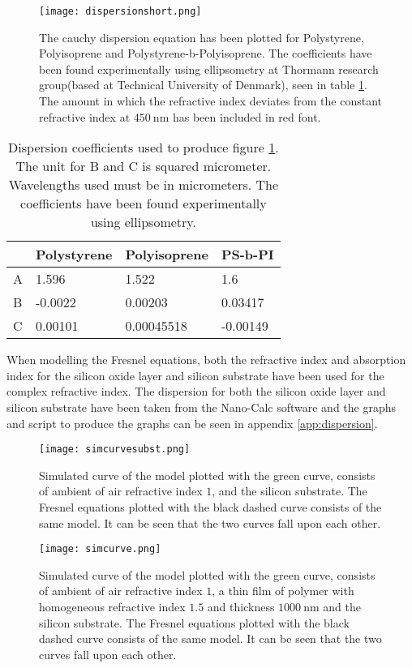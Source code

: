 \documentclass[MasterThesisMain.tex]{subfiles}
\begin{document}
\begin{figure}[H]
\centering
\texttt{[image: dispersionshort.png]}
\caption{The cauchy dispersion equation has been plotted for Polystyrene, Polyisoprene and Polystyrene-b-Polyisoprene. The coefficients have been found experimentally using ellipsometry at Thormann research group(based at Technical University of Denmark), seen in table \ref{tab:disco}. The amount in which the refractive index deviates from the constant refractive index at $\SI{450}{\nano\meter}$ has been included in red font.}
\label{fig:dispshort}
\end{figure} 

\begin{table}[H]
\centering
\begin{tabular}{|l|l|l|l|}
\hline
  & Polystyrene & Polyisoprene & PS-b-PI  \\ \hline
A & 1.596       & 1.522        & 1.6      \\ \hline
B & -0.0022     & 0.00203      & 0.03417  \\ \hline
C & 0.00101     & 0.00045518   & -0.00149 \\ \hline
\end{tabular}
\caption{Dispersion coefficients used to produce figure \ref{fig:dispshort}. The unit for B and C is squared micrometer. Wavelengths used must be in micrometers. The coefficients have been found experimentally using ellipsometry.}
\label{tab:disco}
\end{table}

When modelling the Fresnel equations, both the refractive index and absorption index for the silicon oxide layer and silicon substrate have been used for the complex refractive index. The dispersion for both the silicon oxide layer and silicon substrate have been taken from the Nano-Calc software and the graphs and script to produce the graphs can be seen in appendix \ref{app:dispersion}.  

\begin{figure}[H]
\centering
\texttt{[image: simcurvesubst.png]}
\caption{Simulated curve of the model plotted with the green curve, consists of ambient of air refractive index $1$, and the silicon substrate. The Fresnel equations plotted with the black dashed curve consists of the same model. It can be seen that the two curves fall upon each other.}
\label{fig:simmodelsubst}
\end{figure}

\begin{figure}[H]
\centering
\texttt{[image: simcurve.png]}
\caption{Simulated curve of the model plotted with the green curve, consists of ambient of air refractive index $1$, a thin film of polymer with homogeneous refractive index $1.5$ and thickness $\SI{1000}{\nano\meter}$ and the silicon substrate. The Fresnel equations plotted with the black dashed curve consists of the same model. It can be seen that the two curves fall upon each other.}
\label{fig:simmodel1}
\end{figure}
\end{document}
